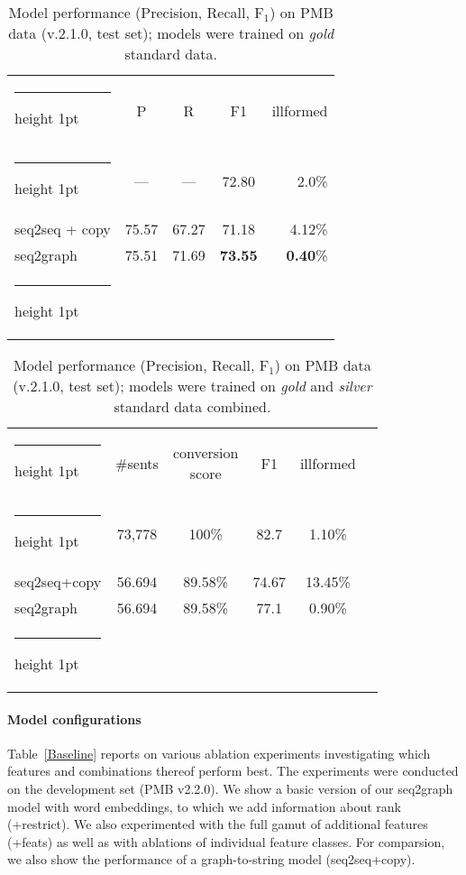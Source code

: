 \documentclass[11pt,a4paper]{article}
\makeatletter
\theoremstyle{plain}
\newcommand{\thickhline}{\noalign {\ifnum 0=`}\fi \hrule height 1pt
    \futurelet \reserved@a \@xhline
}
\makeatother
\begin{document}
\begin{table}[t]
\begin{center}
\begin{small}
\begin{tabular}{@{}l@{~~}cccr@{}} \thickhline
 & P & R & F1 & illformed\\
\thickhline
 \citet{van2018exploring} & --- & --- & 72.80 & 2.0\%\\
seq2seq + copy & 75.57 & 67.27 & 71.18 & 4.12\%\\
seq2graph & 75.51 & 71.69 & {\bf 73.55} & {\bf 0.40}\%\\\thickhline
\end{tabular}
\end{small}
\caption{Model performance (Precision, Recall, F$_1$) on PMB data
  (v.2.1.0, test set); models were trained on \emph{gold} standard data.}
\label{baseline_comp}
\end{center}
\end{table}

\begin{table}[t]
\begin{center}
\begin{small}
\begin{tabular}{@{}l@{~~~}c@{~~}c@{~}c@{~~}c@{~~}c@{}} \thickhline
& \#sents & \shortstack{conversion\\score} & F1 & illformed\\
\thickhline
\citet{van2018exploring} & 73,778 & 100\% & 82.7 & 1.10\%\\
seq2seq+copy & 56.694 & 89.58\% & 74.67 & 13.45\%\\
seq2graph & 56.694 & 89.58\% & 77.1 & 0.90\%\\ \thickhline
\end{tabular}
\end{small}
\caption{Model performance (Precision, Recall, F$_1$) on PMB data
  (v.2.1.0, test set); models were trained on \emph{gold} and
  \emph{silver} standard data combined.}
\label{silveren}
\end{center}
\end{table}

\paragraph{Model configurations}
Table~\ref{Baseline} reports on various ablation experiments investigating which features and combinations thereof perform best. The experiments were conducted on the
development set (PMB v2.2.0). We show a basic version of our seq2graph
model with word embeddings, to which we add information about rank (+restrict). We also experimented with the
full gamut of additional features (+feats) as well as with ablations
of individual feature classes. For comparsion, we also show the
performance of a graph-to-string model (seq2seq+copy).
\end{document}
